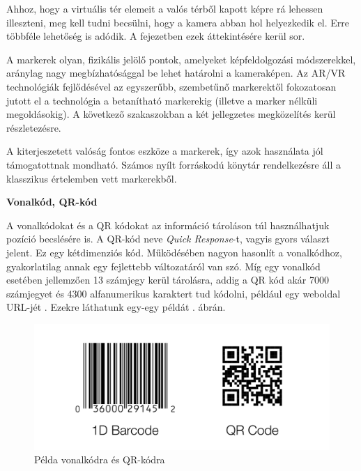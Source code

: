 
Ahhoz, hogy a virtuális tér elemeit a valós térből kapott képre rá lehessen illeszteni, meg kell tudni becsülni, hogy a kamera abban hol helyezkedik el.
Erre többféle lehetőség is adódik.
A fejezetben ezek áttekintésére kerül sor.


A markerek olyan, fizikális jelölő pontok, amelyeket képfeldolgozási módszerekkel, a\-rány\-lag nagy megbízhatósággal be lehet határolni a kameraképen.
Az AR/VR technológiák fejlődésével az egyszerűbb, szembetűnő markerektől fokozatosan jutott el a technológia a betanítható markerekig (illetve a marker nélküli megoldásokig).
A következő szakaszokban a két jellegzetes megközelítés kerül részletezésre.


A kiterjeszetett valóság fontos eszköze a markerek, így azok használata jól támogatottnak mondható. Számos nyílt forráskodú könytár rendelkezésre áll a klasszikus értelemben vett markerekből.

\bigskip

\noindent \textbf{Vonalkód, QR-kód}

\medskip

A vonalkódokat és a QR kódokat az információ tároláson túl használhatjuk pozíció becslésére is.
A QR-kód neve \textit{Quick Response}-t, vagyis gyors választ jelent.
Ez egy kétdimenziós kód. Működésében nagyon hasonlít a vonalkódhoz, gyakorlatilag annak egy fejlettebb változatáról van szó.
Míg egy vonalkód esetében jellemzően 13 számjegy kerül tárolásra, addig a QR kód akár 7000 számjegyet és 4300 alfanumerikus karaktert tud kódolni, például egy weboldal URL-jét \cite{tiwari2016introduction}.
Ezekre láthatunk egy-egy példát . ábrán.

\begin{figure}[htp]
    \centering
   	\includegraphics[scale=0.25]{images/qr_bar.png}
	\caption{Példa vonalkódra és QR-kódra}
	\label{fig:barcode}
\end{figure}


